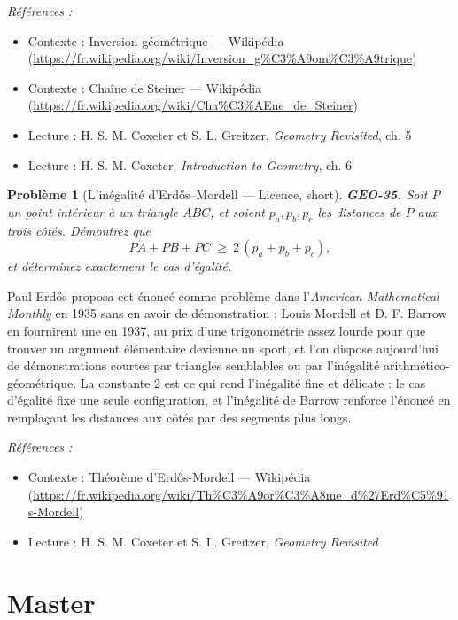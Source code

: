 \documentclass[11pt]{article}
\newtheorem{problem}{Problème}
\newenvironment{refs}{\par\small\noindent\emph{Références :}\begin{itemize}\setlength\itemsep{0pt}}{\end{itemize}\normalsize}
\begin{document}
\begin{refs}
\item Contexte : Inversion géométrique --- Wikipédia (\url{https://fr.wikipedia.org/wiki/Inversion_g%C3%A9om%C3%A9trique})
\item Contexte : Chaîne de Steiner --- Wikipédia (\url{https://fr.wikipedia.org/wiki/Cha%C3%AEne_de_Steiner})
\item Lecture : H. S. M. Coxeter et S. L. Greitzer, \textit{Geometry Revisited}, ch. 5
\item Lecture : H. S. M. Coxeter, \textit{Introduction to Geometry}, ch. 6
\end{refs}

\bigskip

\begin{problem}[{L'inégalité d'Erd\H{o}s--Mordell --- Licence, short}]
\textbf{GEO-35.} Soit $ P $ un point intérieur à un triangle $ ABC $, et
soient $ p_a, p_b, p_c $ les distances de $ P $ aux trois côtés. Démontrez que
\[ PA + PB + PC \ \ge \ 2\,(p_a + p_b + p_c) , \]
et déterminez exactement le cas d'égalité.
\end{problem}

\noindent Paul Erd\H{o}s proposa cet énoncé comme problème dans l'\textit{American Mathematical
Monthly} en 1935 sans en avoir de démonstration ; Louis Mordell et D. F. Barrow en fournirent
une en 1937, au prix d'une trigonométrie assez lourde pour que trouver un argument élémentaire
devienne un sport, et l'on dispose aujourd'hui de démonstrations courtes par triangles semblables
ou par l'inégalité arithmético-géométrique. La constante $ 2 $ est ce qui rend l'inégalité fine
et délicate : le cas d'égalité fixe une seule configuration, et l'inégalité de Barrow renforce
l'énoncé en remplaçant les distances aux côtés par des segments plus longs.

\begin{refs}
\item Contexte : Théorème d'Erd\H{o}s-Mordell --- Wikipédia (\url{https://fr.wikipedia.org/wiki/Th%C3%A9or%C3%A8me_d%27Erd%C5%91s-Mordell})
\item Lecture : H. S. M. Coxeter et S. L. Greitzer, \textit{Geometry Revisited}
\end{refs}

\bigskip


\section*{Master}
\end{document}
